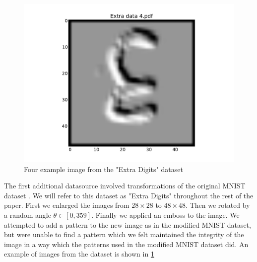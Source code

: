 \documentclass[conference]{IEEEtran}
\begin{document}
\begin{figure}[h]
	\includegraphics[scale=0.20]{Extradata4.pdf}
	\caption{Four example image from the "Extra Digits" dataset}
	\label{ExtraData}
\end{figure}

The first additional datasource involved transformations of the original MNIST dataset \cite{MNIST_Original}. We will refer to this dataset as "Extra Digits" throughout the rest of the paper. First we enlarged the images from $28\times 28$ to $48\times 48$. Then we rotated by a random angle $\theta \in  [0,359]$. Finally we applied an emboss to the image. We attempted to add a pattern to the new image as in the modified MNIST dataset, but were unable to find a pattern which we felt maintained the integrity of the image in a way which the patterns used in the modified MNIST dataset did. An example of images from the dataset is shown in \ref{ExtraData}
\end{document}
